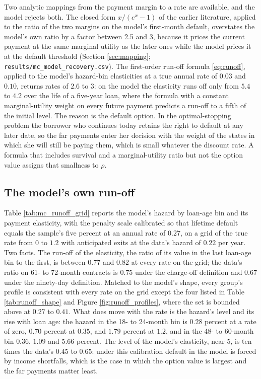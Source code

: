 \documentclass[12pt,english]{article}
\begin{document}
Two analytic mappings from the payment margin to a rate are available, and the model rejects both. The closed form $x/(e^x-1)$ of the earlier literature, applied to the ratio of the two margins on the model's first-month default, overstates the model's own ratio by a factor between 2.5 and 3, because it prices the current payment at the same marginal utility as the later ones while the model prices it at the default threshold (Section \ref{sec:mapping}; \texttt{results/mc\_model\_recovery.csv}). The first-order run-off formula \eqref{eq:runoff}, applied to the model's hazard-bin elasticities at a true annual rate of $0.03$ and $0.10$, returns rates of $2.6$ to $3$: on the model the elasticity runs off only from $5.4$ to $4.2$ over the life of a five-year loan, where the formula with a constant marginal-utility weight on every future payment predicts a run-off to a fifth of the initial level. The reason is the default option. In the optimal-stopping problem the borrower who continues today retains the right to default at any later date, so the far payments enter her decision with the weight of the states in which she will still be paying them, which is small whatever the discount rate. A formula that includes survival and a marginal-utility ratio but not the option value assigns that smallness to $\rho$.

\subsection{The model's own run-off}

Table \ref{tab:mc_runoff_grid} reports the model's hazard by loan-age bin and its payment elasticity, with the penalty scale calibrated so that lifetime default equals the sample's five percent at an annual rate of $0.27$, on a grid of the true rate from $0$ to $1.2$ with anticipated exits at the data's hazard of $0.22$ per year. Two facts. The run-off of the elasticity, the ratio of its value in the last loan-age bin to the first, is between $0.77$ and $0.82$ at every rate on the grid; the data's ratio on 61- to 72-month contracts is $0.75$ under the charge-off definition and $0.67$ under the ninety-day definition. Matched to the model's shape, every group's profile is consistent with every rate on the grid except the four listed in Table \ref{tab:runoff_shape} and Figure \ref{fig:runoff_profiles}, where the set is bounded above at $0.27$ to $0.41$. What does move with the rate is the hazard's level and its rise with loan age: the hazard in the 18- to 24-month bin is $0.28$ percent at a rate of zero, $0.70$ percent at $0.35$, and $1.79$ percent at $1.2$, and in the 48- to 60-month bin $0.36$, $1.09$ and $5.66$ percent. The level of the model's elasticity, near $5$, is ten times the data's $0.45$ to $0.65$: under this calibration default in the model is forced by income shortfalls, which is the case in which the option value is largest and the far payments matter least.
\end{document}
